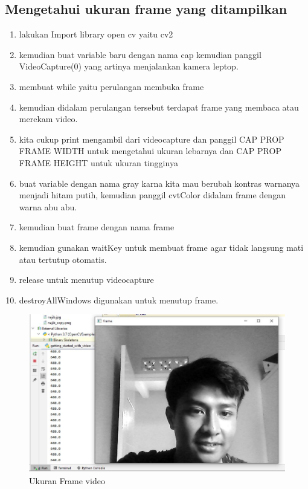 \newpage
\subsection{Mengetahui ukuran frame yang ditampilkan}

\begin{enumerate}
	\item lakukan Import library open cv yaitu cv2
	\item kemudian buat variable baru dengan nama cap kemudian panggil VideoCapture(0) yang artinya menjalankan kamera leptop.
	\item membuat while yaitu perulangan membuka frame
	\item kemudian didalam perulangan tersebut terdapat frame yang membaca atau merekam video.
	\item kita cukup print mengambil dari videocapture dan panggil CAP PROP FRAME WIDTH untuk mengetahui ukuran lebarnya dan CAP PROP FRAME HEIGHT untuk ukuran tingginya 
	\item buat variable dengan nama gray karna kita mau berubah kontras warnanya menjadi hitam putih, kemudian panggil cvtColor didalam frame dengan warna abu abu.
	\item kemudian buat frame dengan nama frame
	\item kemudian gunakan waitKey untuk membuat frame agar tidak langsung mati atau tertutup otomatis.
	\item release untuk menutup videocapture
	\item destroyAllWindows digunakan untuk menutup frame.
\end{enumerate}

\newpage
\begin{figure}[ht]
\centering
\includegraphics[scale=0.5]{figures/2,6.jpg}
\caption{Ukuran Frame video}
\label{contoh}
\end{figure}

